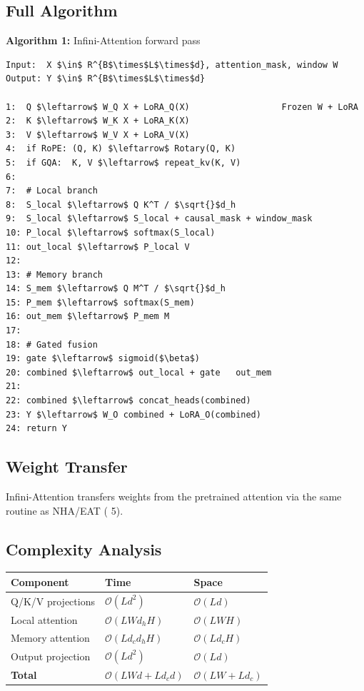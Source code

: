 \subsection{Full Algorithm}

\textbf{Algorithm 1:} Infini-Attention forward pass
\begin{lstlisting}
Input:  X $\in$ R^{B$\times$L$\times$d}, attention_mask, window W
Output: Y $\in$ R^{B$\times$L$\times$d}

1:  Q $\leftarrow$ W_Q X + LoRA_Q(X)                  Frozen W + LoRA
2:  K $\leftarrow$ W_K X + LoRA_K(X)
3:  V $\leftarrow$ W_V X + LoRA_V(X)
4:  if RoPE: (Q, K) $\leftarrow$ Rotary(Q, K)
5:  if GQA:  K, V $\leftarrow$ repeat_kv(K, V)
6:
7:  # Local branch
8:  S_local $\leftarrow$ Q K^T / $\sqrt{}$d_h
9:  S_local $\leftarrow$ S_local + causal_mask + window_mask
10: P_local $\leftarrow$ softmax(S_local)
11: out_local $\leftarrow$ P_local V
12:
13: # Memory branch
14: S_mem $\leftarrow$ Q M^T / $\sqrt{}$d_h
15: P_mem $\leftarrow$ softmax(S_mem)
16: out_mem $\leftarrow$ P_mem M
17:
18: # Gated fusion
19: gate $\leftarrow$ sigmoid($\beta$)
20: combined $\leftarrow$ out_local + gate   out_mem
21:
22: combined $\leftarrow$ concat_heads(combined)
23: Y $\leftarrow$ W_O combined + LoRA_O(combined)
24: return Y
\end{lstlisting}

\subsection{Weight Transfer}

Infini-Attention transfers weights from the pretrained attention via the 
same routine as NHA/EAT ( 5).

\subsection{Complexity Analysis}

\begin{table}[H]
\centering
\small
\begin{tabular}{lll}
\toprule
\textbf{Component} & \textbf{Time} & \textbf{Space} \\
\midrule
Q/K/V projections & $\mathcal{O}(L d^2)$ & $\mathcal{O}(L d)$ \\
Local attention & $\mathcal{O}(L W d_h H)$ & $\mathcal{O}(L W H)$ \\
Memory attention & $\mathcal{O}(L d_c d_h H)$ & $\mathcal{O}(L d_c H)$ \\
Output projection & $\mathcal{O}(L d^2)$ & $\mathcal{O}(L d)$ \\
\textbf{Total} & $\mathcal{O}(L W d + L d_c d)$ & $\mathcal{O}(L W + L d_c)$ \\
\bottomrule
\end{tabular}
\end{table}

